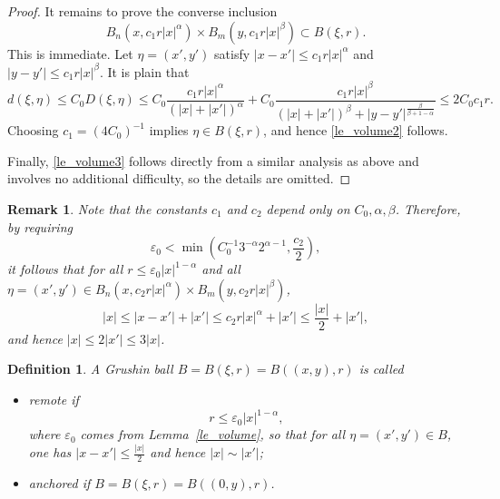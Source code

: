 \documentclass[12pt]{amsart}
\newtheorem{definition}[theorem]{Definition}
\newtheorem{remark}[theorem]{Remark}
\begin{document}
\begin{proof}
It remains to prove the converse inclusion
\begin{equation*}
B_n(x, c_1 r |x|^\alpha) \times B_m(y, c_1 r |x|^\beta) \subset B(\xi, r).
\end{equation*}
This is immediate. Let $\eta = (x',y')$ satisfy $|x-x'|\le c_1 r |x|^\alpha$ and $|y-y'|\le c_1 r |x|^\beta$. It is plain that
\begin{equation*}
d(\xi,\eta)\le C_0 D(\xi,\eta)\le C_0 \frac{c_1 r |x|^\alpha}{\left(|x|+|x'|\right)^\alpha} + C_0 \frac{c_1 r |x|^\beta}{\left(|x|+|x'|\right)^\beta+|y-y'|^{\frac{\beta}{\beta+1-\alpha}}} \le 2 C_0 c_1 r.
\end{equation*}
Choosing $c_1 = (4C_0)^{-1}$ implies $\eta \in B(\xi,r)$, and hence \eqref{le_volume2} follows.

Finally, \eqref{le_volume3} follows directly from a similar analysis as above and involves no additional difficulty, so the details are omitted.
\end{proof}


\begin{remark}
Note that the constants $c_1$ and $c_2$ depend only on $C_0,\alpha,\beta$. Therefore, by requiring
\begin{equation*}
\varepsilon_0< \min \left( C_0^{-1} 3^{-\alpha} 2^{\alpha-1}, \frac{c_2}{2} \right),
\end{equation*}
it follows that for all $r\le \varepsilon_0 |x|^{1-\alpha}$ and all $\eta = (x',y') \in B_n(x, c_2 r |x|^\alpha) \times B_m(y, c_2 r |x|^\beta)$,
\begin{equation*}
|x|\le |x-x'|+|x'| \le c_2 r |x|^{\alpha} + |x'| \le \frac{|x|}{2} +|x'|,
\end{equation*}
and hence $|x|\le 2|x'|\le 3|x|$.
\end{remark}

\begin{definition}
A Grushin ball $B=B(\xi,r) = B((x,y), r)$ is called
\begin{itemize}
\item remote if
\begin{equation*}
r \le \varepsilon_0 |x|^{1-\alpha},
\end{equation*}
where $\varepsilon_0$ comes from Lemma~\ref{le_volume}, so that for all $\eta = (x',y')\in B$, one has $|x-x'|\le \frac{|x|}{2}$ and hence $|x|\sim |x'|$;
\item anchored if $B=B(\xi,r) = B((0,y),r)$.
\end{itemize}
\end{definition}
\end{document}
